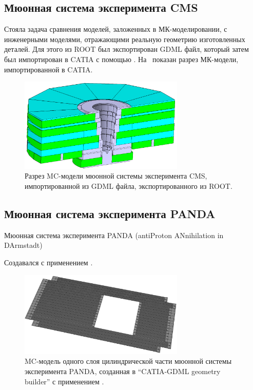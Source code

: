 \subsection{Мюонная система эксперимента CMS}\label{sec:secCmsMuon}

Стояла задача сравнения моделей, заложенных в МК-моделировании, с инженерными моделями, отражающими реальную геометрию изготовленных деталей. Для этого из ROOT был экспортирован GDML файл, который затем был импортирован в CATIA с помощью . На~ показан разрез МК-модели, импортированной в CATIA.

\begin{figure}[H]
\centering
\includegraphics[width=0.7\textwidth]{pictures/CMS_MUON.png}
\caption{Разрез MC-модели мюонной системы эксперимента CMS, импортированной из GDML файла, экспортированного из ROOT.}
\label{fig:CmsMuon}
\end{figure}

\subsection{Мюонная система эксперимента PANDA}\label{sec:secPandaMuon}

Мюонная система эксперимента PANDA (antiProton ANnihilation in DArmstadt)

Создавался с применением .

\begin{figure}[H]
\centering
\includegraphics[width=0.7\textwidth]{pictures/PANDA_layer.png}
\caption{MC-модель одного слоя цилиндрической части мюонной системы эксперимента PANDA, созданная в ``CATIA-GDML geometry builder'' с применением .}
\label{fig:PandaMuonLayer}
\end{figure}

